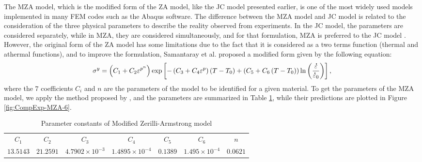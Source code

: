 \documentclass[twoside,english,1p,final,sort&compress]{elsarticle}
\makeatletter
\theoremstyle{plain}
\DeclareRobustCommand{\mdot}[1]{\accentset{\mbox{\bfseries .}}{#1}}
\DeclareRobustCommand{\eal}{et al.\@\xspace}
\makeatother
\begin{document}
The MZA model, which is the modified form of the ZA model, like the JC model presented earlier, is one of the most widely used models implemented in many FEM codes such as the Abaqus software.
The difference between the MZA model and JC model is related to the consideration of the three physical parameters to describe the reality observed from experiments.
In the JC model, the parameters are considered separately, while in MZA, they are considered simultaneously, and for that formulation, MZA is preferred to the JC model \cite{Hull-2011}.
However, the original form of the ZA model has some limitations due to the fact that it is considered as a two terms function (thermal and athermal functions), and to improve the formulation, Samantaray \eal \cite{Samantaray-2009} proposed a modified form given by the following equation:
\begin{equation}
\label{eq:MZA-model}
\sigma^y = \left(C_{1}+C_{2}\varepsilon^{p^n}\right) \exp\left[-\left(C_{3}+C_{4}\varepsilon^p\right)\left(T-T_0\right) + \left(C_{5}+C_{6}\left(T-T_0\right)\right)\ln\left( \frac{\mdot\varepsilon}{\mdot{\varepsilon}_0}\right)\right],
\end{equation}
where the $7$ coefficients $C_i$ and $n$ are the parameters of the model to be identified for a given material.
To get the parameters of the MZA model, we apply the method proposed by \cite{Samantaray-2009}, and the parameters are summarized in Table \ref{tab:MZA}, while their predictions are plotted in Figure \ref{fig:CompExp-MZA-6}.
\begin{table}[h!]
\centering{}
\caption{Parameter constants of Modified Zerilli-Armstrong model}
\begin{tabular}{ccccccc}
	\hline
	  $C_1$   &   $C_2$   &         $C_3$          &         $C_4$          &  $C_5$   &         $C_6$         &   $n$    \\
	$13.5143$ & $21.2591$ & $4.7902\times 10^{-3}$ & $1.4895\times 10^{-4}$ & $0.1389$ & $1.495\times 10^{-4}$ & $0.0621$ \\ \hline
\end{tabular}
\label{tab:MZA}
\end{table}
\end{document}
